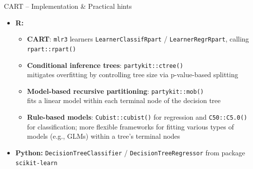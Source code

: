 \begin{frame}{CART -- Implementation \& Practical hints}

\begin{itemize}
  \item \textbf{R:}
  \begin{itemize}
      \item \textbf{CART}: \texttt{mlr3} learners \texttt{LearnerClassifRpart} / 
    \texttt{LearnerRegrRpart}, calling \texttt{rpart::rpart()}
    \item \textbf{Conditional inference trees}: \texttt{partykit::ctree()} \\ mitigates overfitting by controlling tree size via p-value-based splitting
    \item \textbf{Model-based recursive partitioning}: \texttt{partykit::mob()} \\ fits a linear model within each terminal node of the decision tree
    \item \textbf{Rule-based models}: \texttt{Cubist::cubist()} for regression and \texttt{C50::C5.0()} for classification; more flexible frameworks for fitting various types of models (e.g., GLMs) within a tree's terminal nodes
  \end{itemize}
  \item \textbf{Python:} \texttt{DecisionTreeClassifier} / 
  \texttt{DecisionTreeRegressor} from package \texttt{scikit-learn}
\end{itemize}

\end{frame}

